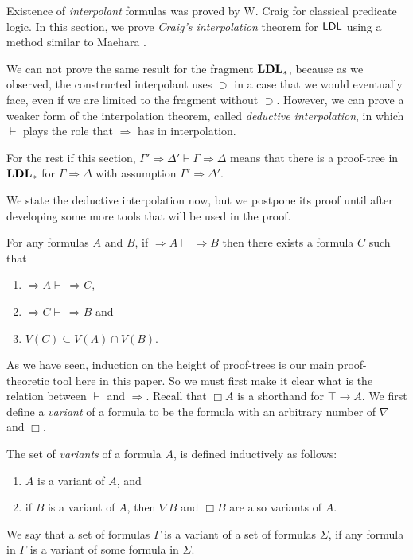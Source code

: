 Existence of \emph{interpolant} formulas was proved by W. Craig \cite{CraigA} for classical predicate logic. In this section, we prove \emph{Craig's interpolation} theorem for $\mathsf{LDL}$ using a method similar to Maehara \cite{maehara1960interpolation}.




We can not prove the same result for the fragment $\mathbf{LDL}_*$, because as we observed, the constructed interpolant uses $\supset$ in a case that we would eventually face, even if we are limited to the fragment without $\supset$. However, we can prove a weaker form of the interpolation theorem, called \emph{deductive interpolation}, in which $\vdash$ plays the role that $\Rightarrow$ has in interpolation.

\begin{nota}
  For the rest if this section, $\Gamma' \Rightarrow \Delta' \vdash \Gamma \Rightarrow \Delta$ means that there is a proof-tree in $\mathbf{LDL}_*$ for $\Gamma \Rightarrow \Delta$ with assumption $\Gamma' \Rightarrow \Delta'$.
\end{nota}

We state the deductive interpolation now, but we postpone its proof until after developing some more tools that will be used in the proof.

\begin{thm}\label{thm:deductive}
  For any formulas $A$ and $B$, if $\Rightarrow A \vdash\ \Rightarrow B$ then there exists a formula $C$ such that
	\begin{enumerate}[label=(\arabic*)]
		\item $\Rightarrow A \vdash\ \Rightarrow C$,
		\item $\Rightarrow C \vdash\ \Rightarrow B$ and
		\item $V(C) \subseteq V(A) \cap V(B)$.
	\end{enumerate}
\end{thm}

As we have seen, induction on the height of proof-trees is our main proof-theoretic tool here in this paper. So we must first make it clear what is the relation between $\vdash$ and $\Rightarrow$. Recall that $\Box A$ is a shorthand for $\top \rightarrow A$. We first define a \emph{variant} of a formula to be the formula with an arbitrary number of $\nabla$ and $\Box$.

\begin{dfn}
  The set of \emph{variants} of a formula $A$, is defined inductively as follows:
  \begin{enumerate}
    \item $A$ is a variant of $A$, and
    \item if $B$ is a variant of $A$, then $\nabla B$ and $\Box B$ are also variants of $A$.
  \end{enumerate}
  We say that a set of formulas $\Gamma$ is a variant of a set of formulas $\Sigma$, if any formula in $\Gamma$ is a variant of some formula in $\Sigma$.
\end{dfn}

